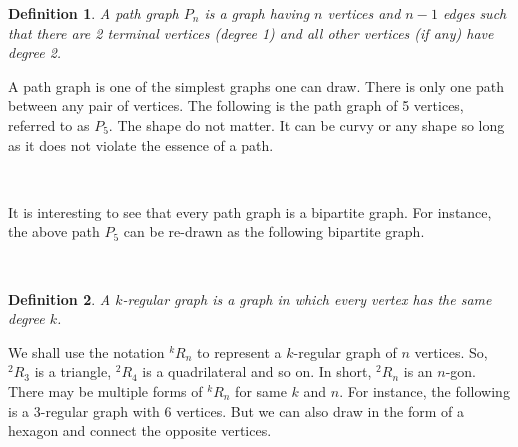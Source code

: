 \documentclass[a4paper, 12pt]{article}
\newtheorem*{definition}{Definition} %
\theoremstyle{remark} %
\begin{document}
\begin{definition}
	A path graph  $P_n$ is a graph having $n$ vertices and $n-1$ edges such that there are 2 terminal vertices (degree 1) and all other vertices (if any) have degree 2.
\end{definition}

A path graph is one of the simplest graphs one can draw. There is only one path between any pair of vertices. The following is the path graph of 5 vertices, referred to as $P_5$. The shape do not matter. It can be curvy or any shape so long as it does not violate the essence of a path.\\

\begin{center}
\\
\end{center}

It is interesting to see that every path graph is a bipartite graph. For instance, the above path $P_5$ can be re-drawn as the following bipartite graph.\\

\begin{center}
\\
\end{center}

\begin{definition}
	A $k$-regular graph  is a graph in which every vertex has the same degree $k$.
\end{definition}

We shall use the notation $^k R_n$ to represent a $k$-regular graph of $n$ vertices. So, $^2 R_3$ is a triangle, $^2 R_4$ is a quadrilateral and so on. In short, $^2 R_n$ is an $n$-gon. There may be multiple forms of $^k R_n$ for same $k$ and $n$. For instance, the following is a $3$-regular graph with $6$ vertices. But we can also draw in the form of a hexagon and connect the opposite vertices.\\
\end{document}
